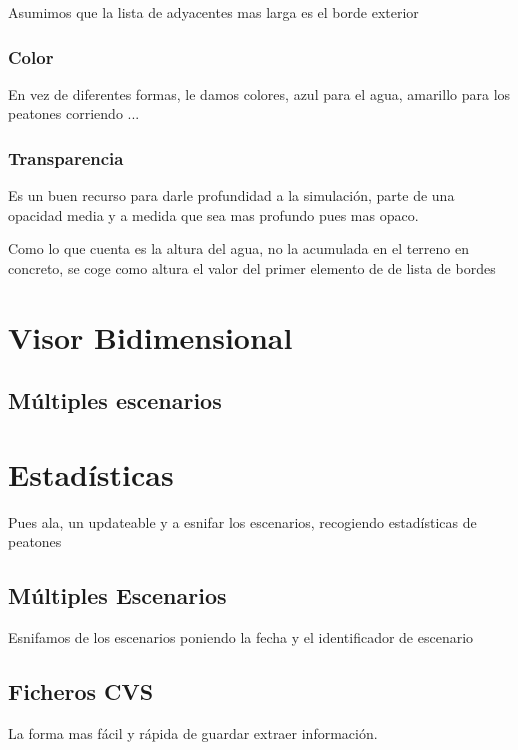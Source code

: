 Asumimos que la lista de adyacentes mas larga es el borde exterior
\subsubsection*{Color}
En vez de diferentes formas, le damos colores, azul para el agua, amarillo para
los peatones corriendo ...
\subsubsection*{Transparencia}
Es un buen recurso para darle profundidad a la simulación, parte de una
opacidad media y a medida que sea mas profundo pues mas opaco.

Como lo que cuenta es la altura del agua, no la acumulada en el terreno en
concreto, se coge como altura el valor del primer elemento de de lista de bordes
\section*{Visor Bidimensional}
\subsection*{Múltiples escenarios}
\section*{Estadísticas}
Pues ala, un updateable y a esnifar los escenarios, recogiendo estadísticas de
peatones
\subsection*{Múltiples Escenarios}
Esnifamos de los escenarios poniendo la fecha y el identificador de escenario
\subsection*{Ficheros CVS}
La forma mas fácil y rápida de guardar extraer información.